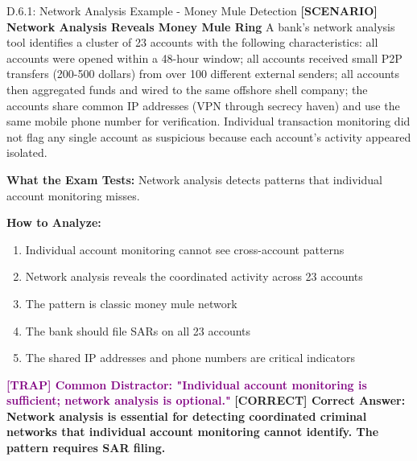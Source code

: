 \documentclass[11pt,a4paper]{beamer}
\newcommand{\trap}[1]{\textcolor{purple}{\textbf{[TRAP] #1}}}
\newcommand{\correct}[1]{\textcolor{green!50!black}{\textbf{[CORRECT] #1}}}
\newcommand{\scenario}[1]{\textcolor{blue!70!black}{\textbf{[SCENARIO] #1}}}
\begin{document}
\begin{frame}{D.6.1: Network Analysis Example - Money Mule Detection}
	\scenario{Network Analysis Reveals Money Mule Ring}
	A bank's network analysis tool identifies a cluster of 23 accounts with the following characteristics: all accounts were opened within a 48-hour window; all accounts received small P2P transfers (200-500 dollars) from over 100 different external senders; all accounts then aggregated funds and wired to the same offshore shell company; the accounts share common IP addresses (VPN through secrecy haven) and use the same mobile phone number for verification. Individual transaction monitoring did not flag any single account as suspicious because each account's activity appeared isolated.
	
	\vspace{0.1cm}
	\textbf{What the Exam Tests:} Network analysis detects patterns that individual account monitoring misses.
	
	\vspace{0.1cm}
	\textbf{How to Analyze:}
	\begin{enumerate}
		\item Individual account monitoring cannot see cross-account patterns
		\item Network analysis reveals the coordinated activity across 23 accounts
		\item The pattern is classic money mule network
		\item The bank should file SARs on all 23 accounts
		\item The shared IP addresses and phone numbers are critical indicators
	\end{enumerate}
	
	\trap{Common Distractor: "Individual account monitoring is sufficient; network analysis is optional."}
	\correct{Correct Answer: Network analysis is essential for detecting coordinated criminal networks that individual account monitoring cannot identify. The pattern requires SAR filing.}
\end{frame}
\end{document}

